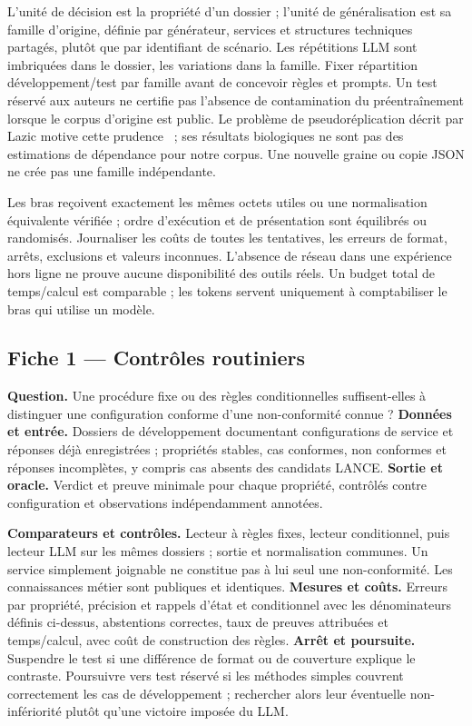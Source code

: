 \documentclass[11pt,a4paper]{article}
\begin{document}
L'unité de décision est la propriété d'un dossier ; l'unité de généralisation
est sa famille d'origine, définie par générateur, services et structures
techniques partagés, plutôt que par identifiant de scénario. Les répétitions
LLM sont imbriquées dans le dossier, les variations dans la famille. Fixer
répartition développement/test par famille avant de concevoir règles et prompts.
Un test réservé aux auteurs ne certifie pas l'absence de contamination du
préentraînement lorsque le corpus d'origine est public. Le problème de pseudoréplication
décrit par Lazic motive cette prudence~\cite{lazic} ; ses résultats biologiques
ne sont pas des estimations de dépendance pour notre corpus. Une nouvelle
graine ou copie JSON ne crée pas une famille indépendante.

Les bras reçoivent exactement les mêmes octets utiles ou une normalisation
équivalente vérifiée ; ordre d'exécution et de présentation sont équilibrés
ou randomisés. Journaliser les coûts de toutes les tentatives, les erreurs de
format, arrêts, exclusions et valeurs inconnues. L'absence de réseau dans une
expérience hors ligne ne prouve aucune disponibilité des outils réels.
Un budget total de temps/calcul est comparable ; les tokens servent uniquement
à comptabiliser le bras qui utilise un modèle.

\subsection{Fiche 1 --- Contrôles routiniers}
\textbf{Question.} Une procédure fixe ou des règles conditionnelles suffisent-elles
à distinguer une configuration conforme d'une non-conformité connue ?
\textbf{Données et entrée.} Dossiers de développement documentant configurations
de service et réponses déjà enregistrées ; propriétés stables, cas conformes,
non conformes et réponses incomplètes, y compris cas absents des candidats LANCE.
\textbf{Sortie et oracle.} Verdict et preuve minimale pour chaque propriété,
contrôlés contre configuration et observations indépendamment annotées.

\textbf{Comparateurs et contrôles.} Lecteur à règles fixes, lecteur conditionnel,
puis lecteur LLM sur les mêmes dossiers ; sortie et normalisation communes.
Un service simplement joignable ne constitue pas à lui seul une non-conformité.
Les connaissances métier sont publiques et identiques.
\textbf{Mesures et coûts.} Erreurs par propriété, précision et rappels d'état
et conditionnel avec les dénominateurs définis ci-dessus, abstentions correctes,
taux de preuves attribuées et temps/calcul,
avec coût de construction des règles.
\textbf{Arrêt et poursuite.} Suspendre le test si une différence de format ou
de couverture explique le contraste. Poursuivre vers test réservé si les
méthodes simples couvrent correctement les cas de développement ; rechercher
alors leur éventuelle non-infériorité plutôt qu'une victoire imposée du LLM.
\end{document}
